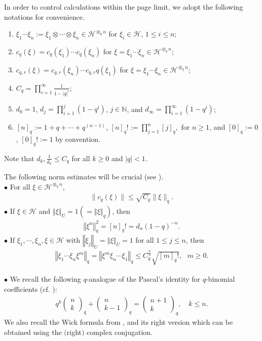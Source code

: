 \documentclass[12pt, a4paper,reqno]{amsart}
\theoremstyle{definition}
\renewcommand{\leq}{\leqslant}
\renewcommand{\geq}{\geqslant}
\def\N{\mathbb N}
\newcommand{\CH}{\mathcal{H}}
\newcommand{\norm}[1]{\left\Vert#1\right\Vert}
\newcommand{\abs}[1]{\left\vert#1\right\vert}
\begin{document}
In order to control calculations within the page limit, we adopt the following notations for convenience.
\begin{enumerate}
\item $\xi_1\cdots\xi_n := \xi_1\otimes\cdots\otimes \xi_n \in \CH^{\otimes_q n}$ for 	 $ \xi_i\in \CH $, $1\leq i\leq n$;
\item $c_q(\xi)=c_q(\xi_1)\cdots c_q(\xi_n)$ for $\xi=\xi_1\cdots\xi_n\in \CH^{\otimes_q n}$;
\item $c_{q,r}(\xi)=c_{q,r}(\xi_n)\cdots c_{q,r}q(\xi_1)$ for
  $\xi=\xi_1\cdots\xi_n\in \CH^{\otimes_q n}$;
\item $C_q= \prod_{i=1}^\infty \frac 1{1-|q|^i}$;\\
\item $d_0=1$, $d_j=\prod_{i=1}^j (1-q^i)$, $j\in\N$, and $d_\infty =\prod_{i=1}^\infty (1-q^i)$; \\	 
\item $[n]_q := 1+ q+ \cdots +  q^{(n-1)}$, $[n]_q! :=\prod_{j=1}^{n} [j]_q, \text{ for }n\geq 1$,    
and $[0]_q := 0$, $[0]_q! := 1$ by convention.
\end{enumerate}
{Note that $d_k,\frac{1}{d_k}\leq C_q$ for all $k\geq 0$ and $\abs{q}<1$}.

The following norm estimates will be crucial (see  \cite{BKS,BS,B99,ER}).\\
\noindent$\bullet$ For all  $\xi \in \CH^{\otimes_q n }$, 
\begin{align}\label{Normelt}
\| c_q(\xi)\|\leq \sqrt{C_q} \|\xi\|_q.
\end{align}
\noindent$\bullet$ If $\xi\in \CH$ and ${\norm{\xi}}_U = 1(=\norm{\xi}_q)$, then 
\begin{align}\label{Normelt2}
{\norm{\xi^{ n}}}_q^2 = [n]_q! = d_n(1-q)^{-n}. 
\end{align}
\noindent$\bullet$ If $\xi_1,\cdots, \xi_n , \xi \in \CH$ with $ {\norm{\xi_j}}_U={\norm{\xi}}_U = 1$ for all $1\leq j\leq n$, then 
\begin{align}\label{normestimate}
{\norm{\xi_1 \cdots \xi_n \xi^{ m}}}_q  = {\norm{ \xi^{ m} \xi_n \cdots \xi_1}}_q
\leq C_q^{\frac{n}{2}} \sqrt{ [m]_q!}, \text{ }m\geq 0.
\end{align}

\noindent$\bullet$
We recall the following  $q$-analogue of the Pascal's identity for $q$-binomial coefficients (cf. \cite[Prop. 1.8]{BKS}):
\begin{align}\label{Pascal}
q^k \left( \begin{matrix} n\\ k \end{matrix}\right)_q + \left( \begin{matrix} n\\ k-1 \end{matrix}\right)_q = \left( \begin{matrix} n+1 \\ k \end{matrix}\right)_q,\quad  k \leq n.
\end{align}
We also recall the Wick formula from \cite{B99, nou}, and its right version which can be obtained using the $($right$)$ complex  conjugation.
\end{document}
